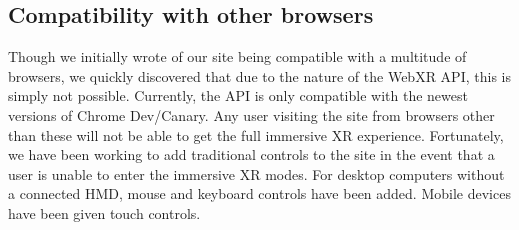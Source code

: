 \documentclass[onecolumn, draftclsnofoot,10pt, compsoc]{IEEEtran}
\begin{document}

\subsection{Compatibility with other browsers}
Though we initially wrote of our site being compatible with a multitude of browsers, we quickly discovered that due to the nature of the WebXR API, this is simply not possible. Currently, the API is only compatible with the newest versions of Chrome Dev/Canary. Any user visiting the site from browsers other than these will not be able to get the full immersive XR experience. Fortunately, we have been working to add traditional controls to the site in the event that a user is unable to enter the immersive XR modes. For desktop computers without a connected HMD, mouse and keyboard controls have been added. Mobile devices have been given touch controls.
\end{document}
